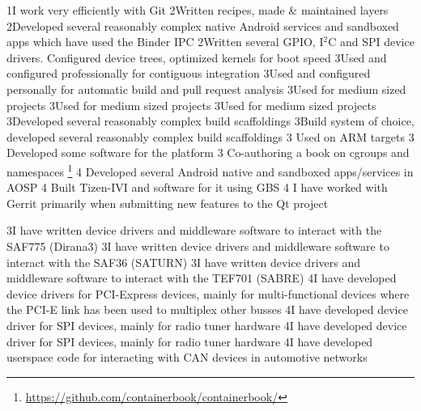 \documentclass{twocolcv}
\begin{document}
 {
                {1}{I work very efficiently with Git}
              {2}{Written recipes, made \& maintained layers}
     {2}{Developed several reasonably complex native Android services and sandboxed apps which have used the Binder IPC}
       {2}{Written several GPIO, I$^2$C and SPI device drivers. Configured device trees, optimized kernels for boot speed}
            {3}{Used and configured professionally for contiguous integration }
          {3}{Used and configured personally for automatic build and pull request analysis }
            {3}{Used for medium sized projects}
               {3}{Used for medium sized projects}
             {3}{Used for medium sized projects}
           {3}{Developed several reasonably complex build scaffoldings}
              {3}{Build system of choice, developed several reasonably complex build scaffoldings}
             {3} {Used on ARM targets}
          {3} {Developed some software for the platform}
        {3} {Co-authoring a book on cgroups and namespaces \footnote{\url{https://github.com/containerbook/containerbook/}}}
       {4} {Developed several Android native and sandboxed apps/services in AOSP}
     {4} {Built Tizen-IVI and software for it using GBS}
                     {4} {I have worked with Gerrit primarily when submitting new features to the Qt project}
}

 {
      {3}{I have written device drivers and middleware software to interact with the SAF775 (Dirana3)}
       {3}{I have written device drivers and middleware software to interact with the SAF36 (SATURN)}
      {3}{I have written device drivers and middleware software to interact with the TEF701 (SABRE)}
     {4}{I have developed device drivers for PCI-Express devices, mainly for multi-functional devices where the PCI-E link has been used to multiplex other busses}
             {4}{I have developed device driver for SPI devices, mainly for radio tuner hardware}
          {4}{I have developed device driver for SPI devices, mainly for radio tuner hardware}
             {4}{I have developed userspace code for interacting with CAN devices in automotive networks}
}
\end{document}
